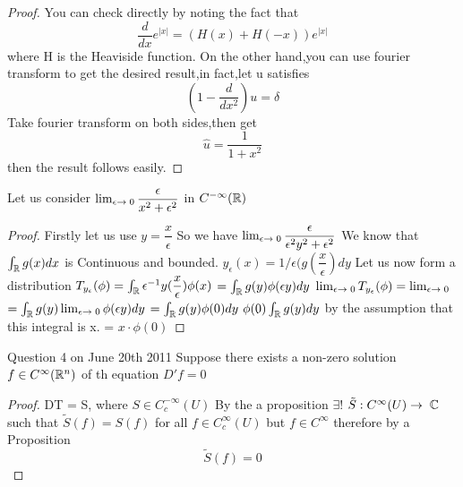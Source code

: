\begin{proof}
 You can check directly by noting the fact that 
$$
\frac{d}{dx}e^{|x|}=(H(x)+H(-x))e^{|x|}
$$
where H is the Heaviside function.
On the other hand,you can use fourier transform to get the desired result,in fact,let u satisfies
$$
(1-\frac{d}{dx^2})u=\delta
$$
Take fourier transform on both sides,then get 
$$
\hat{u}=\frac{1}{1+x^2}
$$
then the result follows easily.
\end{proof}
\begin{ex}
 Let us consider 
$ \lim_{\epsilon \rightarrow \; 0} \dfrac{\epsilon}{x^{2} + \epsilon^{2}} $ in $C^{-\infty}(\mathbb{R})$
\end{ex}
\begin{proof}
 Firstly let us use $y = \dfrac{x}{\epsilon}$\newline
So we have $\lim_{\epsilon \rightarrow \; 0} \dfrac{\epsilon}{\epsilon^{2} y^{2} + \epsilon^{2}}$\newline
We know that $\int_{\mathbb{R}} g(x)dx$ is Continuous and bounded.\newline
$y_{\epsilon}(x) = 1/\epsilon(g(\dfrac{x}{\epsilon})dy$ \newline
Let us now form a distribution \newline
$T_{y_{\epsilon}}(\phi) = \int_{\mathbb{R}} \epsilon^{-1} y(\dfrac{x}{\epsilon}) \phi(x)$\newline
$= \int_{\mathbb{R}} g(y) \phi(\epsilon y) dy$
$\lim_{\epsilon \rightarrow \; 0} T_{y_{\epsilon}}(\phi) = \lim_{\epsilon \rightarrow \; 0}$\newline
$= \int_{\mathbb{R}} g(y) \lim_{\epsilon \rightarrow \; 0} \phi(\epsilon y) dy$ \newline
$= \int_{\mathbb{R}} g(y) \phi(0) dy$ \newline
$\phi(0) \int_{\mathbb{R}} g(y) dy$ by the assumption that this integral is x. \newline
= $x\cdot \phi(0)$
\end{proof}
\begin{ex}
 Question 4 on June 20th 2011
Suppose there exists a non-zero solution $f \in C^{\infty}(\mathbb{R}^{n})$ of th equation 
$D' f = 0$ 
\end{ex}
\begin{proof}
 DT = S, where $S \in C^{-\infty}_{c}(U)$
By the a proposition $\exists$! $\tilde{S}:C^{\infty}(U) \rightarrow \; \mathbb{C}$
such that 
$\tilde{S}(f) = S(f)$ for all $f \in C^{\infty}_{c}(U)$
but $f \in C^{\infty}$ therefore by a Proposition \begin{equation}\tilde{S}(f) = 0 \end{equation}
\end{proof}
